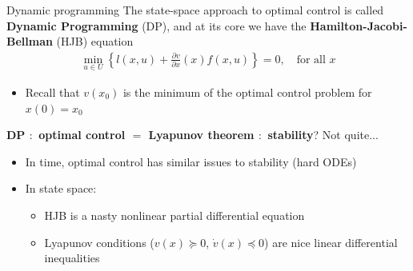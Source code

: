 \documentclass[aspectratio=169]{beamer}
\begin{document}
\begin{frame}{Dynamic programming}
The state-space approach to optimal control is called \textbf{Dynamic Programming} (DP), and at its core we have the \textbf{Hamilton-Jacobi-Bellman} (HJB) equation
\begin{align*}
\min_{u \in U} \left\{ l(x, u) + \frac{\partial v}{\partial x} (x) f(x, u) \right\} = 0, \quad \text{for all } x
\end{align*}
\begin{itemize}
\item
Recall that $v(x_0)$ is the minimum of the optimal control problem for $x(0) = x_0$
\end{itemize}
\textbf{DP $:$ optimal control $=$ Lyapunov theorem $:$ stability}? Not quite...
\begin{itemize}
\item
In time, optimal control has similar issues to stability (hard ODEs)
\item
In state space:
\begin{itemize}
\item
HJB is a nasty {\color{darkred} nonlinear} partial differential {\color{darkred} equation}
\item
Lyapunov conditions ($v(x) \succeq 0$, $\dot v(x) \preceq 0$) are nice {\color{darkgreen} linear} differential {\color{darkgreen} inequalities}
\end{itemize}
\end{itemize}
\end{frame}
\end{document}
